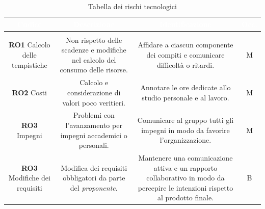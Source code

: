 \begin{center}
\begin{longtable}{C{\colA} | C{\colB} | C{\colC} | C{\colD}}
		\textcolor{white}{\textbf{Codice}} & 
		\textcolor{white}{\textbf{Descrizione}} & 
		\textcolor{white}{\textbf{Identificazione}} & 
		\textcolor{white}{\textbf{Occ.}} \\
		\endfirsthead
	    \\
	    \endfoot
	    \caption{Tabella dei rischi tecnologici}
	    \endlastfoot

\textbf{RO1} \newline Calcolo delle tempistiche &

Non rispetto delle scadenze e modifiche nel calcolo del consumo delle risorse. & 

Affidare a ciascun componente dei compiti e comunicare difficoltà o ritardi.  & 

M \\
\textbf{RO2} \newline Costi &

Calcolo e considerazione di valori poco veritieri.  & 

Annotare le ore dedicate allo studio personale e al lavoro.  & 

M \\
\textbf{RO3} \newline Impegni &

Problemi con l'avanzamento per impegni accademici o personali.  & 

Comunicare al gruppo tutti gli impegni in modo da favorire l'organizzazione.  & 

M \\

\textbf{RO3} \newline Modifiche dei requisiti &

Modifica dei requisiti obbligatori da parte del \textit{proponente}.  & 

Mantenere una comunicazione attiva e un rapporto collaborativo in modo da percepire le intenzioni rispetto al prodotto finale.  & 

B\\

\end{longtable}
\end{center}

